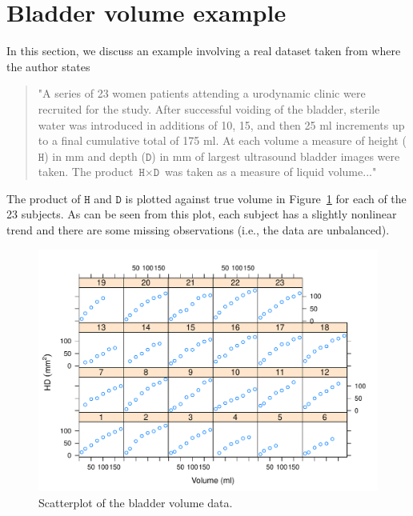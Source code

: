 \documentclass[cmfont,usenames,dvipsnames,leqno]{afit-etd}\usepackage[]{graphicx}\usepackage[]{color}
\makeatletter
\def\maxwidth{ %
  \ifdim\Gin@nat@width>\linewidth
    \linewidth
  \else
    \Gin@nat@width
  \fi
}
\newenvironment{knitrout}{}{} %
\renewenvironment{knitrout}{\begin{singlespace}}{\end{singlespace}}
\makeatother
\begin{document}
\section{Bladder volume example}
\label{sec:bladder-example}
In this section, we discuss an example involving a real dataset taken from \citet{brown_measurement_1993} where the author states
\begin{quotation}
\noindent"A series of 23 women patients attending a urodynamic clinic were recruited for the study. After successful voiding of the bladder, sterile water was introduced in additions of 10, 15, and then 25 ml increments up to a final cumulative total of 175 ml. At each volume a measure of height ($\texttt{H}$) in mm and depth ($\texttt{D}$) in mm of largest ultrasound bladder images were taken. The product $\texttt{H} \times \texttt{D}$ was taken as a measure of liquid volume..."
\end{quotation}
The product of $\texttt{H}$ and $\texttt{D}$ is plotted against true volume in Figure~\ref{fig:bladder-scatter} for each of the 23 subjects. As can be seen from this plot, each subject has a slightly nonlinear trend and there are some missing observations (i.e., the data are unbalanced). 

\begin{knitrout}
\color{fgcolor}\begin{figure}[H]

\includegraphics[width=\maxwidth]{figure/bladder-scatter} \caption[Scatterplot of the bladder volume data]{Scatterplot of the bladder volume data.\label{fig:bladder-scatter}}
\end{figure}


\end{knitrout}
\end{document}
